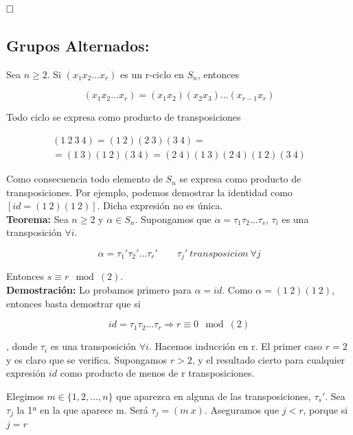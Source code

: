 \documentclass{article}
\begin{document}
$\hfill\square$ \\

\subsection{Grupos Alternados:}
Sea $n\geq 2$. Si $(x_1x_2\ldots x_r)$ es un r-ciclo en $S_n$, entonces 

\begin{equation*}
(x_1x_2\ldots x_r)=(x_1x_2)(x_2x_3)\ldots(x_{r-1}x_r)
\end{equation*}

Todo ciclo se expresa como producto de transposiciones

\begin{gather*}
(1\:2\:3\:4)=(1\:2)(2\:3)(3\:4)= \\
=(1\:3)(1\:2)(3\:4)=(2\:4)(1\:3)(2\:4)(1\:2)(3\:4)
\end{gather*}

Como consecuencia todo elemento de $S_n$ se expresa como producto de transposiciones. Por ejemplo, podemos demostrar la identidad como $[id=(1\:2)(1\:2)]$. Dicha expresión no es única. \\

\textbf{Teorema:} Sea $n\geq 2$ y $\alpha \in S_n$. Supongamos que $\alpha=\tau_1\tau_2\ldots\tau_s$, $\tau_i$ es una transposición $\forall i$.

\begin{equation*}
\alpha=\tau_1'\tau_2'\ldots\tau_r' \qquad \tau_j'\:transposicion\: \forall j
\end{equation*}

Entonces $s\equiv r \mod{(2)}$. \\

\textbf{Demostración:} Lo probamos primero para $\alpha=id$. Como $\alpha=(1\:2)(1\:2)$, entonces basta demostrar que si 

\begin{equation*}
id=\tau_1\tau_2\ldots\tau_r\Rightarrow r\equiv 0\mod{(2)}
\end{equation*}

, donde $\tau_i$ es una transposición $\forall i$. Hacemos inducción en r. El primer caso $r=2$ y es claro que se verifica. Supongamos $r>2$, y el resultado cierto para cualquier expresión $id$ como producto de menos de r transposiciones.

Elegimos $m\in \{1,2,\ldots,n\}$ que aparezca en alguna de las transposiciones, $\tau_s'$. Sea $\tau_j$ la 1ª en la que aparece m. Será $\tau_j=(m\:x)$. Aseguramos que $j<r$, porque si $j=r$
\end{document}

